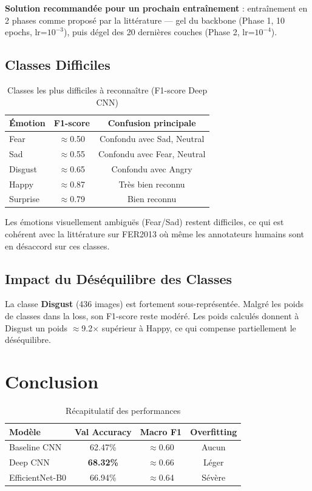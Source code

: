 \documentclass[12pt,a4paper]{article}
\begin{document}
\textbf{Solution recommandée pour un prochain entraînement} : entraînement en 2 phases comme proposé par la littérature --- gel du backbone (Phase 1, 10 epochs, lr=$10^{-3}$), puis dégel des 20 dernières couches (Phase 2, lr=$10^{-4}$).

\subsection{Classes Difficiles}

\begin{table}[H]
\centering
\caption{Classes les plus difficiles à reconnaître (F1-score Deep CNN)}
\begin{tabular}{lcc}
\toprule
\textbf{Émotion} & \textbf{F1-score} & \textbf{Confusion principale} \\
\midrule
Fear    & $\approx$0.50 & Confondu avec Sad, Neutral \\
Sad     & $\approx$0.55 & Confondu avec Fear, Neutral \\
Disgust & $\approx$0.65 & Confondu avec Angry \\
\midrule
Happy   & $\approx$0.87 & Très bien reconnu \\
Surprise & $\approx$0.79 & Bien reconnu \\
\bottomrule
\end{tabular}
\end{table}

Les émotions visuellement ambiguës (Fear/Sad) restent difficiles, ce qui est cohérent avec la littérature sur FER2013 où même les annotateurs humains sont en désaccord sur ces classes.

\subsection{Impact du Déséquilibre des Classes}

La classe \textbf{Disgust} (436 images) est fortement sous-représentée. Malgré les poids de classes dans la loss, son F1-score reste modéré. Les poids calculés donnent à Disgust un poids $\approx$9.2$\times$ supérieur à Happy, ce qui compense partiellement le déséquilibre.

\section{Conclusion}

\begin{table}[H]
\centering
\caption{Récapitulatif des performances}
\begin{tabular}{lccc}
\toprule
\textbf{Modèle} & \textbf{Val Accuracy} & \textbf{Macro F1} & \textbf{Overfitting} \\
\midrule
Baseline CNN    & 62.47\% & $\approx$0.60 & Aucun \\
Deep CNN        & \textbf{68.32\%} & $\approx$0.66 & Léger \\
EfficientNet-B0 & 66.94\% & $\approx$0.64 & \textcolor{danger}{Sévère} \\
\bottomrule
\end{tabular}
\end{table}
\end{document}
